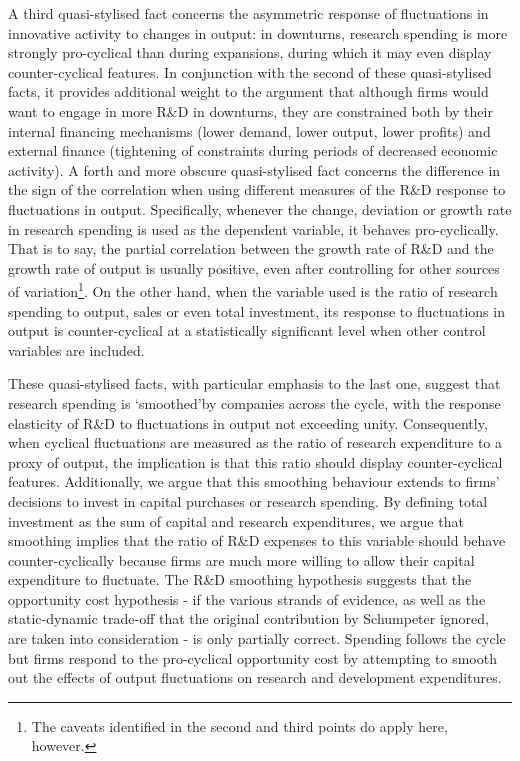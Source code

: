 \documentclass{_latex/house}
\begin{document}
A third quasi-stylised fact concerns the asymmetric response of fluctuations in innovative activity to changes in output: in downturns, research spending is more strongly pro-cyclical than during expansions, during which it may even display counter-cyclical features. In conjunction with the second of these quasi-stylised facts, it provides additional weight to the argument that although firms would want to engage in more R\&D in downturns, they are constrained both by their internal financing mechanisms (lower demand, lower output, lower profits) and external finance (tightening of constraints during periods of decreased economic activity). A forth and more obscure quasi-stylised fact concerns the difference in the sign of the correlation when using different measures of the R\&D response to fluctuations in output. Specifically, whenever the change, deviation or growth rate in research spending is used as the dependent variable, it behaves pro-cyclically. That is to say, the partial correlation between the growth rate of R\&D and the growth rate of output is usually positive, even after controlling for other sources of variation\footnote{The caveats identified in the second and third points do apply here, however.}. On the other hand, when the variable used is the ratio of research spending to output, sales or even total investment, its response to fluctuations in output is counter-cyclical at a statistically significant level when other control variables are included.

These quasi-stylised facts, with particular emphasis to the last one, suggest that research spending is \textquoteleft smoothed\textquoteright\:by companies across the cycle, with the response elasticity of R\&D to fluctuations in output not exceeding unity. Consequently, when cyclical fluctuations are measured as the ratio of research expenditure to a proxy of output, the implication is that this ratio should display counter-cyclical features. Additionally, we argue that this smoothing behaviour extends to firms' decisions to invest in capital purchases or research spending. By defining total investment as the sum of capital and research expenditures, we argue that smoothing implies that the ratio of R\&D expenses to this variable should behave counter-cyclically because firms are much more willing to allow their capital expenditure to fluctuate. The R\&D smoothing hypothesis suggests that the opportunity cost hypothesis - if the various strands of evidence, as well as the static-dynamic trade-off that the original contribution by Schumpeter ignored, are taken into consideration - is only partially correct. Spending follows the cycle but firms respond to the pro-cyclical opportunity cost by attempting to smooth out the effects of output fluctuations on research and development expenditures.
\end{document}

